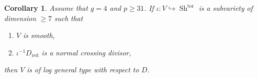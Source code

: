 \documentclass[11pt]{amsart}
\numberwithin{subsection}{section}
\numberwithin{figure}{section}
\numberwithin{table}{section}
\theoremstyle{1}
\newtheorem{corollary}[theorem]{Corollary}
\theoremstyle{2}
\DeclareMathOperator{\Sh}{Sh}
\DeclareMathOperator{\tor}{tor}
\DeclareMathOperator{\red}{red}
\begin{document}
\begin{corollary}
Assume that $g = 4$ and $p \geq 31$. If $\iota : V \hookrightarrow \Sh^{\tor}$ is a subvariety of dimension $\geq 7$ such that
\begin{enumerate}
\item $V$ is smooth,
\item $\iota^{-1}D_{\red}$ is a normal crossing divisor,
\end{enumerate}
then $V$ is of log general type with respect to $D$.
\end{corollary}

{}

\end{document}
